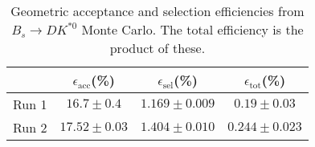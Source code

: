 \begin{table}
    \centering
    \begin{tabular}{cccc}
        \toprule
        & $\epsilon_\mathrm{acc}$(\%) &  $\epsilon_\mathrm{sel}$(\%) &  $\epsilon_\mathrm{tot}$(\%) \\
        \midrule
        Run 1 & $16.7 \pm 0.4$ & $1.169 \pm 0.009$ & $0.19 \pm 0.03$ \\
        Run 2 & $17.52 \pm 0.03$ & $1.404 \pm 0.010$ & $0.244 \pm 0.023$ \\
        \bottomrule
    \end{tabular}
    \caption{Geometric acceptance and selection efficiencies from  $B_s \to DK^{*0}$ Monte Carlo. The total efficiency is the  product of these.}
\label{tab:selection_efficiency_Bs}
\end{table}
